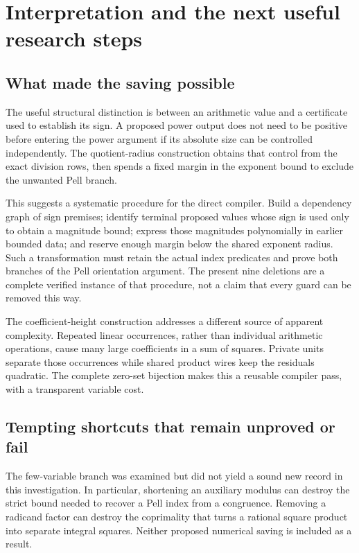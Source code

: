\section{Interpretation and the next useful research steps}

\subsection{What made the saving possible}

The useful structural distinction is between an arithmetic value and a certificate used to establish its sign. A proposed power output does not need to be positive before entering the power argument if its absolute size can be controlled independently. The quotient-radius construction obtains that control from the exact division rows, then spends a fixed margin in the exponent bound to exclude the unwanted Pell branch.

This suggests a systematic procedure for the direct compiler. Build a dependency graph of sign premises; identify terminal proposed values whose sign is used only to obtain a magnitude bound; express those magnitudes polynomially in earlier bounded data; and reserve enough margin below the shared exponent radius. Such a transformation must retain the actual index predicates and prove both branches of the Pell orientation argument. The present nine deletions are a complete verified instance of that procedure, not a claim that every guard can be removed this way.

The coefficient-height construction addresses a different source of apparent complexity. Repeated linear occurrences, rather than individual arithmetic operations, cause many large coefficients in a sum of squares. Private units separate those occurrences while shared product wires keep the residuals quadratic. The complete zero-set bijection makes this a reusable compiler pass, with a transparent variable cost.

\subsection{Tempting shortcuts that remain unproved or fail}

The few-variable branch was examined but did not yield a sound new record in this investigation. In particular, shortening an auxiliary modulus can destroy the strict bound needed to recover a Pell index from a congruence. Removing a radicand factor can destroy the coprimality that turns a rational square product into separate integral squares. Neither proposed numerical saving is included as a result.

